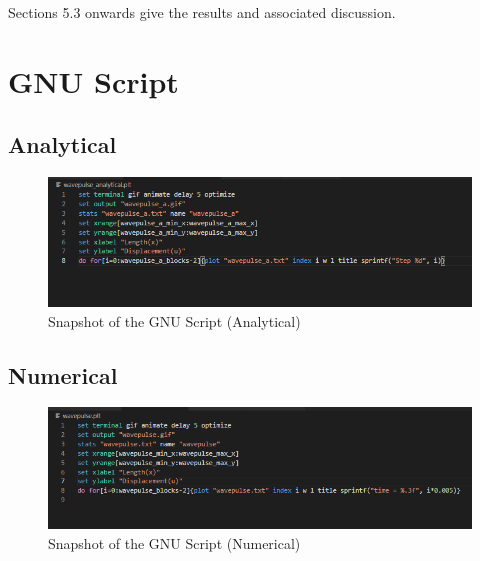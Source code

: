 \documentclass[oneside,hidelinks]{book}
\begin{document}
Sections 5.3 onwards give the results and associated discussion.

                          
                          
                                 
                                       
                                \section{GNU Script}
                                \subsection{Analytical}
                                \phantom{a}
                                \begin{figure}[hbtp]
                                        \caption{Snapshot of the GNU Script (Analytical)}
                                        \hspace*{1cm}\includegraphics[scale=0.7]{wavepulse_gnu_analytical.png}        
                                \end{figure}
                                \subsection{Numerical}
                                \begin{figure}[hbtp]
                                        \caption{Snapshot of the GNU Script (Numerical)}
                                        \hspace*{1cm}\includegraphics[scale=0.7]{wavepulse_gnu_numerical.png}        
                                \end{figure}
\end{document}
